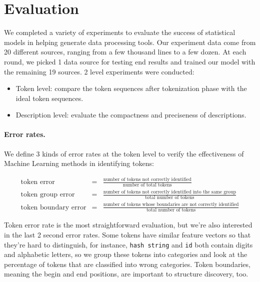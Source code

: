 \section{Evaluation}\label{sec:eval}

We completed a variety of experiments to evaluate the success of
statistical models in helping \learnpads{} generate data processing
tools. Our experiment data come from 20 different sources, ranging
from a few thousand lines to a few dozen. At each round, we picked 1
data source for testing end results and trained our model with the
remaining 19 sources. 2 level experiments were conducted:

\begin{itemize}
\item Token level: compare the token sequences after tokenization
phase with the ideal token sequences.
\item Description level: evaluate the compactness and preciseness
of descriptions.
\end{itemize}

\paragraph*{Error rates.}

We define 3 kinds of error rates at the token level to verify the
effectiveness of Machine Learning methods in identifying tokens:

\begin{eqnarray*}
\textrm{token error} & = & \frac{\textrm{number of tokens not
correctly
identified}}{\textrm{number of total tokens}} \\
\textrm{token group error} & = & \frac{\textrm{number of tokens not
correctly
identified into the same group}}{\textrm{total number of tokens}}\\
\textrm{token boundary error} & = & \frac{\textrm{number of tokens
whose boundaries are not correctly identified}}{\textrm{total number
of tokens}}
\end{eqnarray*}

Token error rate is the most straightforward evaluation, but we're
also interested in the last 2 second error rates. Some tokens have
similar feature vectors so that they're hard to distinguish, for
instance, {\tt hash string} and {\tt id} both contain digits and
alphabetic letters, so we group these tokens into categories and
look at the percentage of tokens that are classified into wrong
categories. Token boundaries, meaning the begin and end positions,
are important to structure discovery, too.

